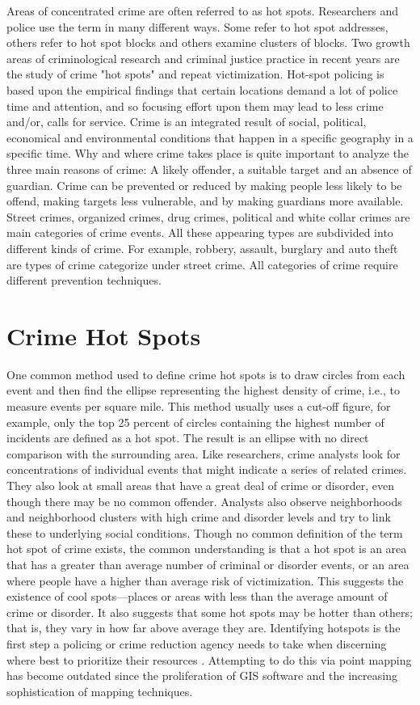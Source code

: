 Areas of concentrated crime are often referred to as hot spots. Researchers and police use the term in many different ways. Some refer to hot spot addresses, others refer to hot spot blocks and others examine clusters of blocks.  Two growth areas of criminological research and criminal justice practice in recent years are the study of crime "hot spots" and repeat victimization. Hot-spot policing is based upon the empirical findings that certain locations demand a lot of police time and attention, and so focusing effort upon them may lead to less crime and/or, calls for service.
Crime is an integrated result of social, political, economical and environmental conditions that happen in a specific geography in a specific time. Why and where crime takes place is quite important to analyze the three main reasons of crime: A likely offender, a suitable target and an absence of guardian. Crime can be prevented or reduced by making people less likely to be offend, making targets less vulnerable, and by making guardians more available. Street crimes, organized crimes, drug crimes, political and white collar crimes are main categories of crime events. All these appearing types are subdivided into different kinds of crime. For example, robbery, assault, burglary and auto theft are types of crime categorize under street crime. All categories of crime require different prevention techniques.

\section{Crime Hot Spots}
One common method used to define crime hot spots is to draw circles from each event and then find the ellipse representing the highest density of crime, i.e., to measure events per square mile. This method usually uses a cut-off figure, for example, only the top 25 percent of circles containing the highest number of incidents are defined as a hot spot. The result is an ellipse with no direct comparison with the surrounding area. 
Like researchers, crime analysts look for concentrations of individual events that might indicate a series of related crimes. They also look at small areas that have a great deal of crime or disorder, even though there may be no common offender. Analysts also observe neighborhoods and neighborhood clusters with high crime and disorder levels and try to link these to underlying social conditions. 
Though no common definition of the term hot spot of crime exists, the common understanding is that a hot spot is an area that has a greater than average number of criminal or disorder events, or an area where people have a higher than average risk of victimization. This suggests the existence of cool spots—places or areas with less than the average amount of crime or disorder. It also suggests that some hot spots may be hotter than others; that is, they vary in how far above average they are.
Identifying hotspots is the first step a policing or crime reduction agency needs to take when discerning where best to prioritize their resources \cite{4}. Attempting to do this via point mapping has become outdated since the proliferation of GIS software and the increasing sophistication of mapping techniques.

